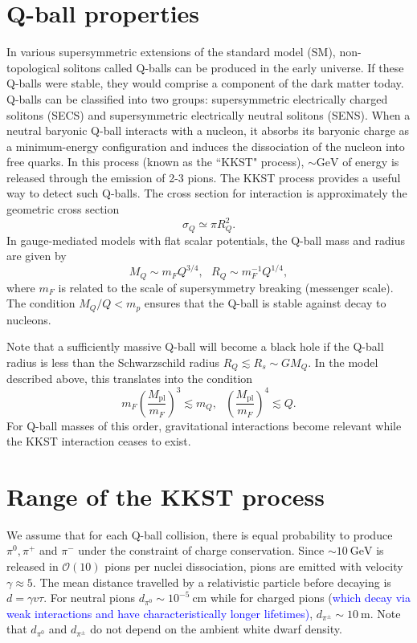 \documentclass[11 pt, preprint,preprintnumbers,amsmath,amssymb, prd]{revtex4}
\newcommand{\OO}{\mathcal{O}}
\newcommand{\Mpl}{M_{\text{pl}}}
\def\r{\right)}
\def\l{\left(}
\begin{document}
\section{Q-ball properties}
In various supersymmetric extensions of the standard model (SM), non-topological solitons called Q-balls can be produced in the early universe. If these Q-balls were stable, they would comprise a component of the dark matter today. Q-balls can be classified into two groups: supersymmetric electrically charged solitons (SECS) and supersymmetric electrically neutral solitons (SENS). When a neutral baryonic Q-ball interacts with a nucleon, it absorbs its baryonic charge as a minimum-energy configuration and induces the dissociation of the nucleon into free quarks. In this process (known as the ``KKST" process), $\sim \text{GeV}$ of energy is released through the emission of 2-3 pions. The KKST process provides a useful way to detect such Q-balls. The cross section for interaction is approximately the geometric cross section
\begin{equation}
\sigma_Q \simeq \pi R_Q^2.
\end{equation}
In gauge-mediated models with flat scalar potentials, the Q-ball mass and radius are given by
\begin{equation}
M_Q \sim m_F Q^{3/4}, ~~~ R_Q \sim m_F^{-1} Q^{1/4},
\end{equation}
where $m_F$ is related to the scale of supersymmetry breaking (messenger scale). The condition $M_Q/Q < m_p$ ensures that the Q-ball is stable against decay to nucleons. 

Note that a sufficiently massive Q-ball will become a black hole if the Q-ball radius is less than the Schwarzschild radius $R_Q \lesssim R_s \sim G M_Q$. In the model described above, this translates into the condition
\begin{equation}
m_F \l\frac{\Mpl}{m_F}\r^3 \lesssim m_Q, ~~~ \l\frac{\Mpl}{m_F}\r^4 \lesssim Q.
\end{equation}
For Q-ball masses of this order, gravitational interactions become relevant while the KKST interaction ceases to exist. 

\section{Range of the KKST process}

We assume that for each Q-ball collision, there is equal probability to produce $\pi^0, \pi^+$ and $\pi^-$ under the constraint of charge conservation. Since $\sim 10 ~\text{GeV}$ is released in $\OO(10)$ pions per nuclei dissociation, pions are emitted with velocity $\gamma \approx 5$. The mean distance travelled by a relativistic particle before decaying is $d = \gamma v \tau$. For neutral pions $d_{\pi^0} \sim 10^{-5} ~\text{cm}$ while for charged pions (\textcolor{blue}{which decay via weak interactions and have characteristically longer lifetimes)}, $d_{\pi^\pm} \sim 10 ~\text{m}$. Note that $d_{\pi^0}$ and $d_{\pi^\pm}$ do not depend on the ambient white dwarf density. 
\end{document}
